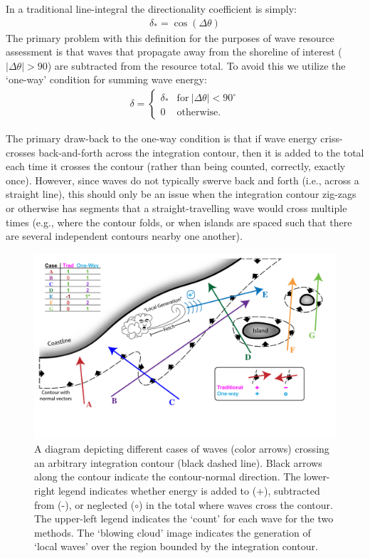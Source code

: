In a traditional line-integral the directionality coefficient is simply:
\begin{align}
    \delta_{*} = \cos(\Delta \theta)
    \label{eqn:trad-def}
\end{align}
The primary problem with this definition for the purposes of wave resource assessment is that waves that propagate away from the shoreline of interest ($|\Delta \theta | > 90$) are subtracted from the resource total. To avoid this we utilize the `one-way' condition for summing wave energy:
\begin{align}
    \delta = 
    \begin{cases}
     \delta_* & \mathrm{for\ }|\Delta \theta|<90^\circ \\
    0 & \mathrm{otherwise}.
    \end{cases}
    \label{eqn:1way-def}
\end{align}

The primary draw-back to the one-way condition is that if wave energy criss-crosses back-and-forth across the integration contour, then it is added to the total each time it crosses the contour (rather than being counted, correctly, exactly once). However, since waves do not typically swerve back and forth (i.e., across a straight line), this should only be an issue when the integration contour zig-zags or otherwise has segments that a straight-travelling wave would cross multiple times (e.g., where the contour folds, or when islands are spaced such that there are several independent contours nearby one another).

\begin{figure}[ht]
    \centering
    \includegraphics[width=\linewidth]{../diagram/Schematic03.pdf}
    \caption{A diagram depicting different cases of waves (color arrows) crossing an arbitrary integration contour (black dashed line). Black arrows along the contour indicate the contour-normal direction. The lower-right legend indicates whether energy is added to (+), subtracted from (-), or neglected ($\circ$) in the total where waves cross the contour. The upper-left legend indicates the `count' for each wave for the two methods. The `blowing cloud' image indicates the generation of `local waves' over the region bounded by the integration contour.}
    \label{fig:one-way-diagram}
\end{figure}


